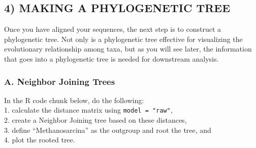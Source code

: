 \documentclass[]{article}
\newenvironment{Shaded}{\begin{snugshade}}{\end{snugshade}}
\newcommand{\KeywordTok}[1]{\textcolor[rgb]{0.13,0.29,0.53}{\textbf{#1}}}
\newcommand{\DataTypeTok}[1]{\textcolor[rgb]{0.13,0.29,0.53}{#1}}
\newcommand{\DecValTok}[1]{\textcolor[rgb]{0.00,0.00,0.81}{#1}}
\newcommand{\FloatTok}[1]{\textcolor[rgb]{0.00,0.00,0.81}{#1}}
\newcommand{\StringTok}[1]{\textcolor[rgb]{0.31,0.60,0.02}{#1}}
\newcommand{\OtherTok}[1]{\textcolor[rgb]{0.56,0.35,0.01}{#1}}
\newcommand{\OperatorTok}[1]{\textcolor[rgb]{0.81,0.36,0.00}{\textbf{#1}}}
\newcommand{\NormalTok}[1]{#1}
\begin{document}
\subsection{4) MAKING A PHYLOGENETIC
TREE}\label{making-a-phylogenetic-tree}

Once you have aligned your sequences, the next step is to construct a
phylogenetic tree. Not only is a phylogenetic tree effective for
visualizing the evolutionary relationship among taxa, but as you will
see later, the information that goes into a phylogenetic tree is needed
for downstream analysis.

\subsubsection{A. Neighbor Joining
Trees}\label{a.-neighbor-joining-trees}

In the R code chunk below, do the following:\\
1. calculate the distance matrix using \texttt{model\ =\ "raw"},\\
2. create a Neighbor Joining tree based on these distances,\\
3. define ``Methanosarcina'' as the outgroup and root the tree, and\\
4. plot the rooted tree.

\begin{Shaded}
\end{Shaded}
\end{document}

